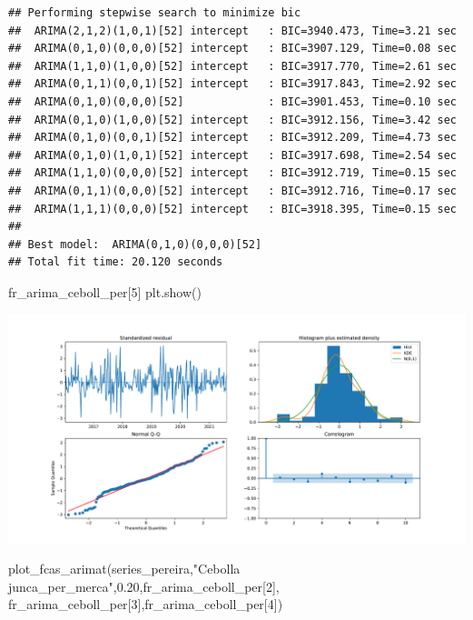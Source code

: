 \documentclass[
]{book}
\newenvironment{Shaded}{\begin{snugshade}}{\end{snugshade}}
\newcommand{\DecValTok}[1]{\textcolor[rgb]{0.00,0.00,0.81}{#1}}
\newcommand{\FloatTok}[1]{\textcolor[rgb]{0.00,0.00,0.81}{#1}}
\newcommand{\NormalTok}[1]{#1}
\newcommand{\StringTok}[1]{\textcolor[rgb]{0.31,0.60,0.02}{#1}}
\begin{document}
\begin{verbatim}
## Performing stepwise search to minimize bic
##  ARIMA(2,1,2)(1,0,1)[52] intercept   : BIC=3940.473, Time=3.21 sec
##  ARIMA(0,1,0)(0,0,0)[52] intercept   : BIC=3907.129, Time=0.08 sec
##  ARIMA(1,1,0)(1,0,0)[52] intercept   : BIC=3917.770, Time=2.61 sec
##  ARIMA(0,1,1)(0,0,1)[52] intercept   : BIC=3917.843, Time=2.92 sec
##  ARIMA(0,1,0)(0,0,0)[52]             : BIC=3901.453, Time=0.10 sec
##  ARIMA(0,1,0)(1,0,0)[52] intercept   : BIC=3912.156, Time=3.42 sec
##  ARIMA(0,1,0)(0,0,1)[52] intercept   : BIC=3912.209, Time=4.73 sec
##  ARIMA(0,1,0)(1,0,1)[52] intercept   : BIC=3917.698, Time=2.54 sec
##  ARIMA(1,1,0)(0,0,0)[52] intercept   : BIC=3912.719, Time=0.15 sec
##  ARIMA(0,1,1)(0,0,0)[52] intercept   : BIC=3912.716, Time=0.17 sec
##  ARIMA(1,1,1)(0,0,0)[52] intercept   : BIC=3918.395, Time=0.15 sec
## 
## Best model:  ARIMA(0,1,0)(0,0,0)[52]          
## Total fit time: 20.120 seconds
\end{verbatim}

\begin{Shaded}
\begin{Highlighting}[]
\NormalTok{fr\_arima\_ceboll\_per[}\DecValTok{5}\NormalTok{]}
\NormalTok{plt.show()}
\end{Highlighting}
\end{Shaded}

\includegraphics{bookdown-demo_files/figure-latex/unnamed-chunk-163-157.pdf}

\begin{Shaded}
\begin{Highlighting}[]

\NormalTok{plot\_fcas\_arimat(series\_pereira,}\StringTok{"Cebolla junca\_per\_merca"}\NormalTok{,}\FloatTok{0.20}\NormalTok{,fr\_arima\_ceboll\_per[}\DecValTok{2}\NormalTok{],}
\NormalTok{fr\_arima\_ceboll\_per[}\DecValTok{3}\NormalTok{],fr\_arima\_ceboll\_per[}\DecValTok{4}\NormalTok{])}
\end{Highlighting}
\end{Shaded}
\end{document}
